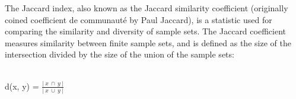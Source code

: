 \documentclass[9pt]{extarticle} %
\begin{document}
%
%
\begin{minipage}[t]{.61\linewidth} %
\vspace{-0.4cm}
\hypertarget{firstnews}{}

The Jaccard index, also known as the Jaccard similarity coefficient (originally coined coefficient de communauté by Paul Jaccard), is a statistic used for comparing the similarity and diversity of sample sets. The Jaccard coefficient measures similarity between finite sample sets, and is defined as the size of the intersection divided by the size of the union of the sample sets: \\
\\
\begingroup
    \fontsize{18pt}{12pt}\selectfont
	\centerline{d(x, y) = $\frac{\vert\ x\ \cap\ y\ \vert}{\vert\ x\ \cup\ y\ \vert}$}
\endgroup
\\


\end{minipage}
\end{document}
